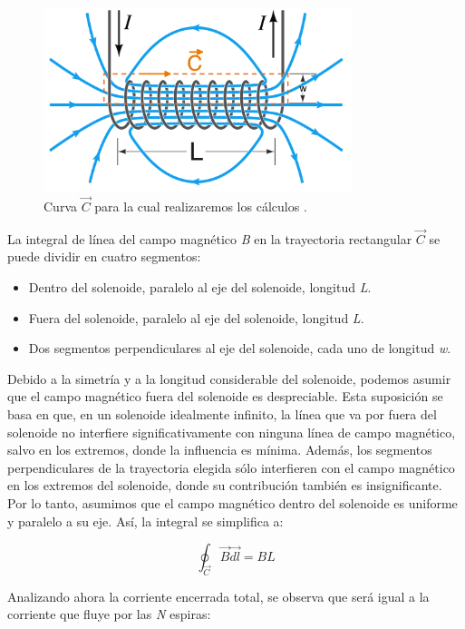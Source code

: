 \begin{figure}[H]
    \centering %
    \includegraphics[width=9cm]{FigurasMemoria/integralampere.png}
    \caption{Curva \textbf{\(\vec{C}\)} para la cual realizaremos los cálculos \citep{artpictures2023}.}
    \label{fig:integralampere} %
\end{figure}

La integral de línea del campo magnético \textit{B} en la trayectoria rectangular \(\vec C\) se puede dividir en cuatro segmentos:
\begin{itemize}
    \item Dentro del solenoide, paralelo al eje del solenoide, longitud \textit{L}.
    \item Fuera del solenoide, paralelo al eje del solenoide, longitud \textit{L}.
    \item Dos segmentos perpendiculares al eje del solenoide, cada uno de longitud \textit{w}.
\end{itemize}

Debido a la simetría y a la longitud considerable del solenoide, podemos asumir que el campo magnético fuera del solenoide es despreciable. Esta suposición se basa en que, en un solenoide idealmente infinito, la línea que va por fuera del solenoide no interfiere significativamente con ninguna línea de campo magnético, salvo en los extremos, donde la influencia es mínima. Además, los segmentos perpendiculares de la trayectoria elegida sólo interfieren con el campo magnético en los extremos del solenoide, donde su contribución también es insignificante. Por lo tanto, asumimos que el campo magnético dentro del solenoide es uniforme y paralelo a su eje. Así, la integral se simplifica a:

\begin{center}
    \[\oint_{\vec{C}}\vec{B} \vec{dl}=BL\]
\end{center}

Analizando ahora la corriente encerrada total, se observa que será igual a la corriente que fluye por las \textit{N} espiras:


